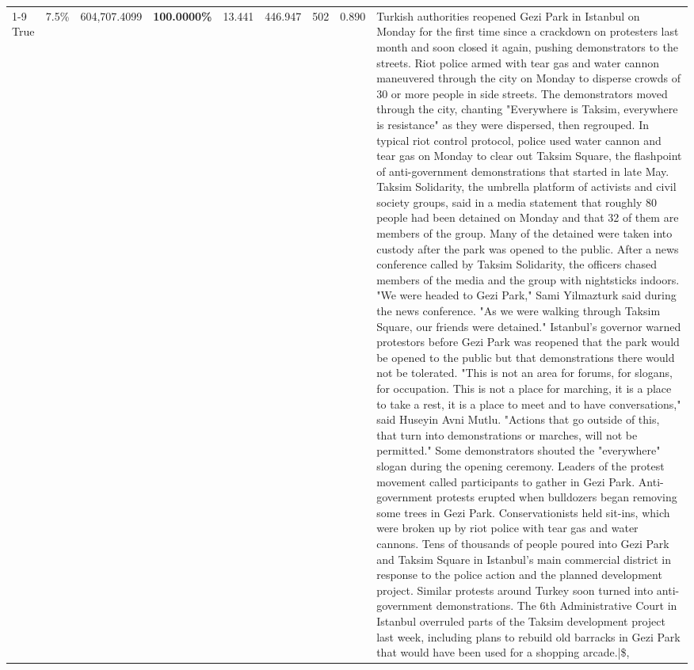 \begin{table}[H]
\begin{tabular}{lllrlllll}
\cline{1-9}
True & 7.5\% & 604,707.4099 & \bfseries \color{red} 100.0000\% & 13.441 & 446.947 & 502 & 0.890 & Turkish authorities reopened Gezi Park in Istanbul on Monday for the first time since a crackdown on protesters last month and soon closed it again, pushing demonstrators to the streets. Riot police armed with tear gas and water cannon maneuvered through the city on Monday to disperse crowds of 30 or more people in side streets. The demonstrators moved through the city, chanting "Everywhere is Taksim, everywhere is resistance" as they were dispersed, then regrouped. In typical riot control protocol, police used water cannon and tear gas on Monday to clear out Taksim Square, the flashpoint of anti-government demonstrations that started in late May. Taksim Solidarity, the umbrella platform of activists and civil society groups, said in a media statement that roughly 80 people had been detained on Monday and that 32 of them are members of the group. Many of the detained were taken into custody after the park was opened to the public. After a news conference called by Taksim Solidarity, the officers chased members of the media and the group with nightsticks indoors. "We were headed to Gezi Park," Sami Yilmazturk said during the news conference. "As we were walking through Taksim Square, our friends were detained." Istanbul's governor warned protestors before Gezi Park was reopened that the park would be opened to the public but that demonstrations there would not be tolerated. "This is not an area for forums, for slogans, for occupation. This is not a place for marching, it is a place to take a rest, it is a place to meet and to have conversations," said Huseyin Avni Mutlu. "Actions that go outside of this, that turn into demonstrations or marches, will not be permitted." Some demonstrators shouted the "everywhere" slogan during the opening ceremony. Leaders of the protest movement called participants to gather in Gezi Park. Anti-government protests erupted when bulldozers began removing some trees in Gezi Park. Conservationists held sit-ins, which were broken up by riot police with tear gas and water cannons. Tens of thousands of people poured into Gezi Park and Taksim Square in Istanbul's main commercial district in response to the police action and the planned development project. Similar protests around Turkey soon turned into anti-government demonstrations. The 6th Administrative Court in Istanbul overruled parts of the Taksim development project last week, including plans to rebuild old barracks in Gezi Park that would have been used for a shopping arcade.|\$, \\

\end{tabular}
\end{table}

